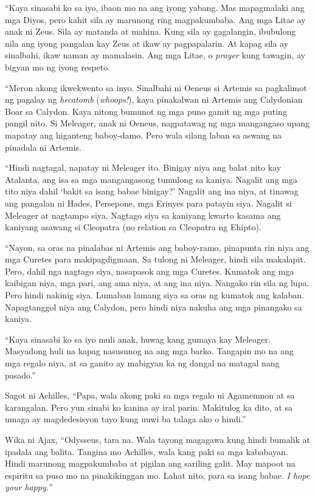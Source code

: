 \documentclass[12pt,letterpaper]{report}
\begin{document}
``Kaya sinasabi ko sa iyo, ibaon mo na ang iyong yabang. Mas mapagmalaki ang mga Diyos, pero kahit sila ay marunong ring magpakumbaba. Ang mga Litae ay anak ni Zeus. Sila ay matanda at mahina. Kung sila ay gagalangin, ibubulong nila ang iyong pangalan kay Zeus at ikaw ay pagpapalarin. At kapag sila ay sinalbahi, ikaw naman ay mamalasin. Ang mga Litae, o \textit{prayer} kung tawagin, ay bigyan mo ng iyong respeto.

``Meron akong ikwekwento sa inyo. Sinalbahi ni Oeneus si Artemis sa pagkalimot ng pagalay ng \textit{hecatomb} (\textit{whoops!}), kaya pinakalwan ni Artemis ang Calydonian Boar sa Calydon. Kaya nitong bumunot ng mga puno gamit ng mga puting pangil nito. Si Meleager, anak ni Oeneus, nagpatawag ng mga mangangaso upang mapatay ang higanteng baboy-damo. Pero wala silang laban sa aswang na pinadala ni Artemis.

``Hindi nagtagal, napatay ni Meleager ito. Binigay niya ang balat nito kay Atalanta, ang isa sa mga mangangasong tumulong sa kaniya. Nagalit ang mga tito niya dahil `bakit sa isang babae binigay?' Nagalit ang ina niya, at tinawag ang pangalan ni Hades, Persepone, mga Erinyes para patayin siya. Nagalit si Meleager at nagtampo siya. Nagtago siya sa kaniyang kwarto kasama ang kaniyang asawang si Cleopatra (no relation sa Cleopatra ng Ehipto).

``Nayon, sa oras na pinalabas ni Artemis ang baboy-ramo, pinapunta rin niya ang mga Curetes para makipagdigmaan. Sa tulong ni Meleager, hindi sila makalapit. Pero, dahil nga nagtago siya, nasapasok ang mga Curetes. Kumatok ang mga kaibigan niya, mga pari, ang ama niya, at ang ina niya. Nangako rin sila ng lupa. Pero hindi nakinig siya. Lumaban lamang siya sa oras ng kumatok ang kalaban. Napagtanggol niya ang Calydon, pero hindi niya nakuha ang mga pinangako sa kaniya.

``Kaya sinasabi ko sa iyo muli anak, huwag kang gumaya kay Meleager. Masyadong huli na kapag nasusunog na ang mga barko. Tangapin mo na ang mga regalo niya, at sa ganito ay mabigyan ka ng dangal na matagal nang pasado.''

Sagot ni Achilles, ``Papa, wala akong paki sa mga regalo ni Agamemnon at sa karangalan. Pero yun sinabi ko kanina ay iral parin. Makitulog ka dito, at sa umaga ay magdedesisyon tayo kung uuwi ba talaga ako o hindi.''

Wika ni Ajax, ``Odysseus, tara na. Wala tayong magagawa kung hindi bumalik at ipadala ang balita. Tangina mo Achilles, wala kang paki sa mga kababayan. Hindi marunong magpakumbaba at pigilan ang sariling galit. May mapoot na espiritu sa puso mo na pinakikinggan mo. Lahat nito, para sa isang babae. \textit{I hope your happy.}''
\end{document}
